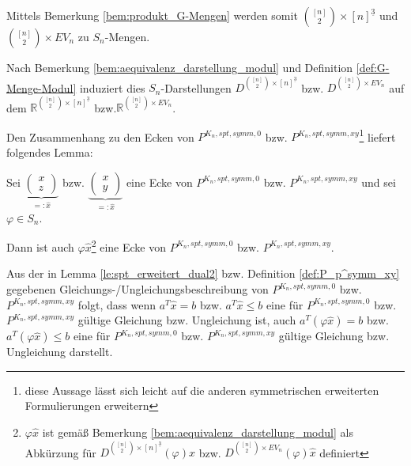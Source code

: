 \documentclass[10p,a4paper,BCOR = 12mm, DIV=15]{scrbook}
\begin{document}
{Mittels Bemerkung \ref{bem:produkt_G-Mengen} werden somit ${\left[n\right] \choose 2} \times \left[n\right]^{\underline{3}}$ und ${\left[n\right] \choose 2} \times EV_n$ zu $S_n$-Mengen.

Nach Bemerkung \ref{bem:aequivalenz_darstellung_modul} und Definition \ref{def:G-Menge-Modul} induziert dies $S_n$-Darstellungen $D^{{\left[n\right] \choose 2} \times \left[n\right]^{\underline{3}}}$ bzw. $D^{{\left[n\right] \choose 2} \times EV_n}$
auf dem $\mathbb{R}^{{\left[n\right] \choose 2} \times \left[n\right]^{\underline{3}}}$ bzw.$\mathbb{R}^{{\left[n\right] \choose 2} \times EV_n}$.

Den Zusammenhang zu den Ecken von $P^{K_n, spt, symm, 0}$ bzw. $P^{K_n, spt, symm, xy}$\footnote{diese Aussage lässt sich leicht auf die anderen symmetrischen erweiterten Formulierungen erweitern} liefert folgendes Lemma:

\begin{Le}
Sei $\underbrace{\left(
\begin{array}{c}
x \\
z
\end{array}
\right)}_{=: \widehat{x}}$ bzw. $\underbrace{\left(
\begin{array}{c}
x \\
y
\end{array}
\right)}_{=: \widehat{x}}$ eine Ecke von $P^{K_n, spt, symm, 0}$ bzw. $P^{K_n, spt, symm, xy}$ und sei $\varphi \in S_n$.

Dann ist auch $\varphi \widehat{x}$\footnote{$\varphi \widehat{x}$ ist gemäß Bemerkung \ref{bem:aequivalenz_darstellung_modul} als Abkürzung für $D^{{\left[n\right] \choose 2} \times \left[n\right]^{\underline{3}}}\left(\varphi\right) \widehat{x}$ bzw. $D^{{\left[n\right] \choose 2} \times EV_n}\left(\varphi\right) \widehat{x}$ definiert} eine Ecke von $P^{K_n, spt, symm, 0}$ bzw. $P^{K_n, spt, symm, xy}$.
\end{Le}
\begin{bew}
Aus der in Lemma \ref{le:spt_erweitert_dual2} bzw. Definition \ref{def:P_p^symm_xy} gegebenen Gleichungs-/Unglei\-chungs\-beschrei\-bung von $P^{K_n, spt, symm, 0}$ bzw. $P^{K_n, spt, symm, xy}$ folgt, dass wenn $a^T \widehat{x} = b$ bzw. $a^T \widehat{x} \leq b$ eine für $P^{K_n, spt, symm, 0}$ bzw. $P^{K_n, spt, symm, xy}$ gültige Gleichung bzw. Ungleichung ist, auch $a^T \left(\varphi \widehat{x}\right) = b$ bzw. $a^T \left(\varphi \widehat{x}\right) \leq b$ eine für $P^{K_n, spt, symm, 0}$ bzw. $P^{K_n, spt, symm, xy}$ gültige Gleichung bzw. Ungleichung darstellt.


\end{bew}}
\end{document}
